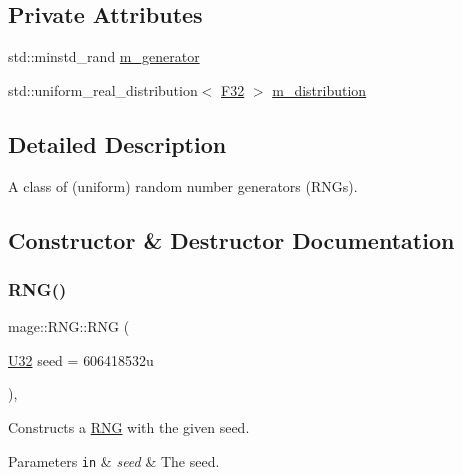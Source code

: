 \subsection*{Private Attributes}
\begin{DoxyCompactItemize}
\item 
std\+::minstd\+\_\+rand \mbox{\hyperlink{classmage_1_1_r_n_g_ad2980cb350eeb3a23a270e243f33ad8b}{m\+\_\+generator}}
\item 
std\+::uniform\+\_\+real\+\_\+distribution$<$ \mbox{\hyperlink{namespacemage_aa97e833b45f06d60a0a9c4fc22ae02c0}{F32}} $>$ \mbox{\hyperlink{classmage_1_1_r_n_g_ac94e7e49a1751dfbfa590cd6da68b032}{m\+\_\+distribution}}
\end{DoxyCompactItemize}


\subsection{Detailed Description}
A class of (uniform) random number generators (R\+N\+Gs). 

\subsection{Constructor \& Destructor Documentation}
\mbox{\label{classmage_1_1_r_n_g_aa428fa24cbe52d5819bd6e8d6abd362a}} 
\subsubsection{\texorpdfstring{R\+N\+G()}{RNG()}\hspace{0.1cm}{\footnotesize\ttfamily [1/3]}}
{\footnotesize\ttfamily mage\+::\+R\+N\+G\+::\+R\+NG (\begin{DoxyParamCaption}\item[{\mbox{\hyperlink{namespacemage_aa5d6eaabaac3cdd01873d6a3d27e90f3}{U32}}}]{seed = {\ttfamily 606418532u} }\end{DoxyParamCaption})\hspace{0.3cm}{\ttfamily [explicit]}, {\ttfamily [noexcept]}}

Constructs a \mbox{\hyperlink{classmage_1_1_r_n_g}{R\+NG}} with the given seed.


\begin{DoxyParams}[1]{Parameters}
\mbox{\tt in}  & {\em seed} & The seed. \\
\hline
\end{DoxyParams}
\mbox{\label{classmage_1_1_r_n_g_a7a215b676b1192d312393e1bd136eb54}} 
